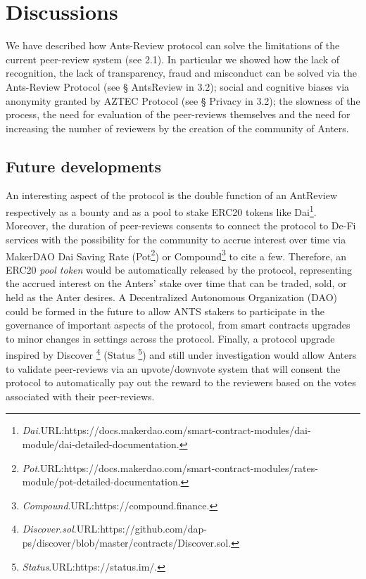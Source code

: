 \documentclass[runningheads]{llncs}
\begin{document}
\section{Discussions}
We have described how Ants-Review protocol can solve the limitations of the current peer-review system (see 2.1). In particular we showed how the lack of recognition, the lack of transparency, fraud and misconduct can be solved via the Ants-Review Protocol (see § AntsReview in 3.2); social and cognitive biases via anonymity granted by AZTEC Protocol (see § Privacy in 3.2); the slowness of the process, the need for evaluation of the peer-reviews themselves and the need for increasing the number of reviewers by the creation of the community of Anters.
\subsection{Future developments}
An interesting aspect of the protocol is the double function of an AntReview respectively as a bounty and as a pool to stake ERC20 tokens like Dai\footnote[14]{\emph{Dai}.\textsc{URL:}https://docs.makerdao.com/smart-contract-modules/dai-module/dai-detailed-documentation.}. Moreover, the duration of peer-reviews consents to connect the protocol to De-Fi services with the possibility for the community to accrue interest over time via MakerDAO Dai Saving Rate (Pot\footnote[16]{\emph{Pot}.\textsc{URL:}https://docs.makerdao.com/smart-contract-modules/rates-module/pot-detailed-documentation.}) or Compound\footnote[17]{\emph{Compound}.\textsc{URL:}https://compound.finance.} to cite a few.
Therefore, an ERC20 \emph{pool token} would be automatically released by the protocol, representing the accrued interest on the Anters' stake over time that can be traded, sold, or held as the Anter desires.
A Decentralized Autonomous Organization (DAO) could be formed in the future to allow ANTS stakers to participate in the governance of important aspects of the protocol, from smart contracts upgrades to minor changes in settings across the protocol.
\newline Finally, a protocol upgrade inspired by Discover \footnote[18]{\emph{Discover.sol}.\textsc{URL:}https://github.com/dap-ps/discover/blob/master/contracts/Discover.sol.} (Status \footnote[19]{\emph{Status}.\textsc{URL:}https://status.im/.}) and still under investigation would allow Anters to validate peer-reviews via an upvote/downvote system that will consent the protocol to automatically pay out the reward to the reviewers based on the votes associated with their peer-reviews.
\end{document}
